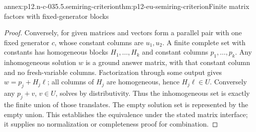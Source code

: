\begin{annexitem}{annex:p12.n-c-035.5.semiring-criterion}{thm:p12-eu-semiring-criterion}{Finite matrix factors with fixed-generator blocks}
\begin{proof}
Conversely, for given matrices and vectors form a parallel pair with
one fixed generator \(c\), whose constant columns are \(u_1,u_2\).
A finite complete set with constants has homogeneous blocks
\(H_1,\ldots,H_k\) and constant columns \(p_1,\ldots,p_k\).
Any inhomogeneous solution \(w\) is a ground answer matrix,
with that constant column and no fresh-variable columns. Factorization
through some output gives \(w=p_j+H_j\ell\); all columns of
\(H_j\) are homogeneous, hence \(H_j\ell\in U\).
Conversely any \(p_j+v\), \(v\in U\), solves by distributivity.
Thus the inhomogeneous set is exactly the finite union of those
translates. The empty solution set is represented by the empty union.
This establishes the equivalence under the stated matrix interface;
it supplies no normalization or completeness proof for combination.
\end{proof}
\end{annexitem}
